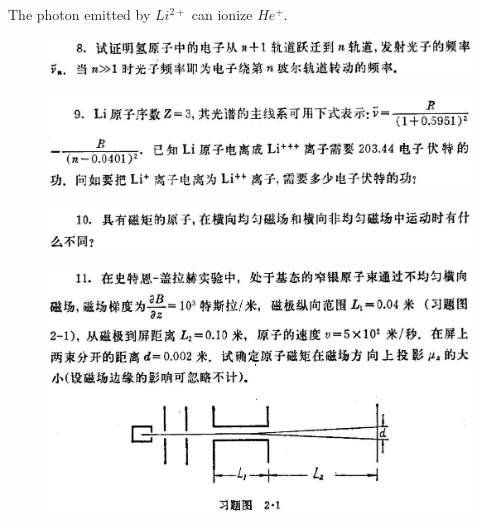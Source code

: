 \documentclass{article}
\begin{document}
The photon emitted by $Li^{2+}$ can ionize $He^+$.

\begin{figure}[H]
  \centering
  \includegraphics[width=\linewidth]{figures/Problem8}
  \label{fig:}
\end{figure}
\begin{figure}[H]
  \centering
  \includegraphics[width=\linewidth]{figures/Problem9}
  \label{fig:}
\end{figure}
\begin{figure}[H]
  \centering
  \includegraphics[width=\linewidth]{figures/Problem10}
  \label{fig:}
\end{figure}
\begin{figure}[H]
  \centering
  \includegraphics[width=\linewidth]{figures/Problem11}
  \label{fig:}
\end{figure}
\end{document}
